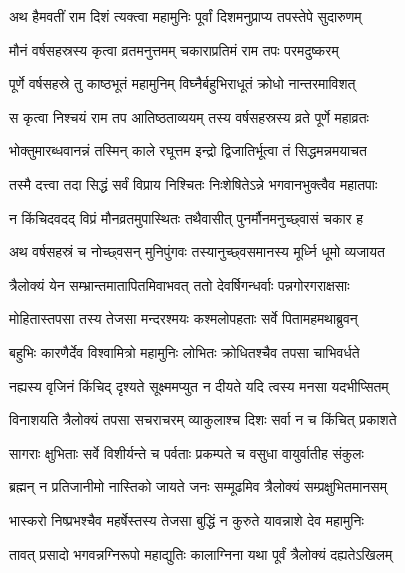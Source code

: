 
\twolineshloka
{अथ हैमवतीं राम दिशं त्यक्त्वा महामुनिः}
{पूर्वां दिशमनुप्राप्य तपस्तेपे सुदारुणम्} %

\twolineshloka
{मौनं वर्षसहस्रस्य कृत्वा व्रतमनुत्तमम्}
{चकाराप्रतिमं राम तपः परमदुष्करम्} %

\twolineshloka
{पूर्णे वर्षसहस्रे तु काष्ठभूतं महामुनिम्}
{विघ्नैर्बहुभिराधूतं क्रोधो नान्तरमाविशत्} %

\twolineshloka
{स कृत्वा निश्चयं राम तप आतिष्ठताव्ययम्}
{तस्य वर्षसहस्रस्य व्रते पूर्णे महाव्रतः} %

\twolineshloka
{भोक्तुमारब्धवानन्नं तस्मिन् काले रघूत्तम}
{इन्द्रो द्विजातिर्भूत्वा तं सिद्धमन्नमयाचत} %

\twolineshloka
{तस्मै दत्त्वा तदा सिद्धं सर्वं विप्राय निश्चितः}
{निःशेषितेऽन्ने भगवानभुक्त्वैव महातपाः} %

\twolineshloka
{न किंचिदवदद् विप्रं मौनव्रतमुपास्थितः}
{तथैवासीत् पुनर्मौनमनुच्छ्वासं चकार ह} %

\twolineshloka
{अथ वर्षसहस्रं च नोच्छ्वसन् मुनिपुंगवः}
{तस्यानुच्छ्वसमानस्य मूर्ध्नि धूमो व्यजायत} %

\twolineshloka
{त्रैलोक्यं येन सम्भ्रान्तमातापितमिवाभवत्}
{ततो देवर्षिगन्धर्वाः पन्नगोरगराक्षसाः} %

\twolineshloka
{मोहितास्तपसा तस्य तेजसा मन्दरश्मयः}
{कश्मलोपहताः सर्वे पितामहमथाब्रुवन्} %

\twolineshloka
{बहुभिः कारणैर्देव विश्वामित्रो महामुनिः}
{लोभितः क्रोधितश्चैव तपसा चाभिवर्धते} %

\twolineshloka
{नह्यस्य वृजिनं किंचिद् दृश्यते सूक्ष्ममप्युत}
{न दीयते यदि त्वस्य मनसा यदभीप्सितम्} %

\twolineshloka
{विनाशयति त्रैलोक्यं तपसा सचराचरम्}
{व्याकुलाश्च दिशः सर्वा न च किंचित् प्रकाशते} %

\twolineshloka
{सागराः क्षुभिताः सर्वे विशीर्यन्ते च पर्वताः}
{प्रकम्पते च वसुधा वायुर्वातीह संकुलः} %

\twolineshloka
{ब्रह्मन् न प्रतिजानीमो नास्तिको जायते जनः}
{सम्मूढमिव त्रैलोक्यं सम्प्रक्षुभितमानसम्} %

\twolineshloka
{भास्करो निष्प्रभश्चैव महर्षेस्तस्य तेजसा}
{बुद्धिं न कुरुते यावन्नाशे देव महामुनिः} %

\twolineshloka
{तावत् प्रसादो भगवन्नग्निरूपो महाद्युतिः}
{कालाग्निना यथा पूर्वं त्रैलोक्यं दह्यतेऽखिलम्} %

